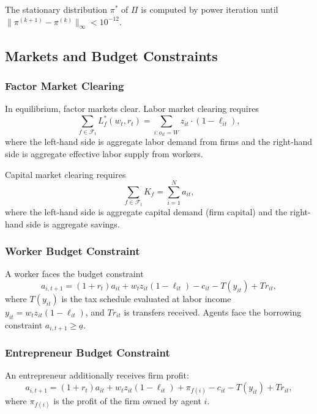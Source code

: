 \documentclass[12pt]{article}
\newcommand{\calF}{\mathcal{F}}
\begin{document}
The stationary distribution $\pi^*$ of $\Pi$ is computed by power iteration until $\|\pi^{(k+1)} - \pi^{(k)}\|_\infty < 10^{-12}$.


\subsection{Markets and Budget Constraints}\label{sec:markets}

\subsubsection{Factor Market Clearing}

In equilibrium, factor markets clear. Labor market clearing requires
\begin{equation}\label{eq:labor_clearing}
  \sum_{f \in \calF_t} L_f^*(w_t, r_t) = \sum_{i: o_{it} = W} z_{it} \cdot (1 - \ell_{it}),
\end{equation}
where the left-hand side is aggregate labor demand from firms and the right-hand side is aggregate effective labor supply from workers.

Capital market clearing requires
\begin{equation}\label{eq:capital_clearing}
  \sum_{f \in \calF_t} K_f = \sum_{i=1}^{N} a_{it},
\end{equation}
where the left-hand side is aggregate capital demand (firm capital) and the right-hand side is aggregate savings.

\subsubsection{Worker Budget Constraint}

A worker faces the budget constraint
\begin{equation}\label{eq:worker_budget}
  a_{i,t+1} = (1 + r_t) a_{it} + w_t z_{it} (1 - \ell_{it}) - c_{it} - T(y_{it}) + Tr_{it},
\end{equation}
where $T(y_{it})$ is the tax schedule evaluated at labor income $y_{it} = w_t z_{it}(1 - \ell_{it})$, and $Tr_{it}$ is transfers received. Agents face the borrowing constraint $a_{i,t+1} \geq \underline{a}$.

\subsubsection{Entrepreneur Budget Constraint}

An entrepreneur additionally receives firm profit:
\begin{equation}\label{eq:entre_budget}
  a_{i,t+1} = (1 + r_t) a_{it} + w_t z_{it}(1 - \ell_{it}) + \pi_{f(i)} - c_{it} - T(y_{it}) + Tr_{it},
\end{equation}
where $\pi_{f(i)}$ is the profit of the firm owned by agent $i$.
\end{document}
